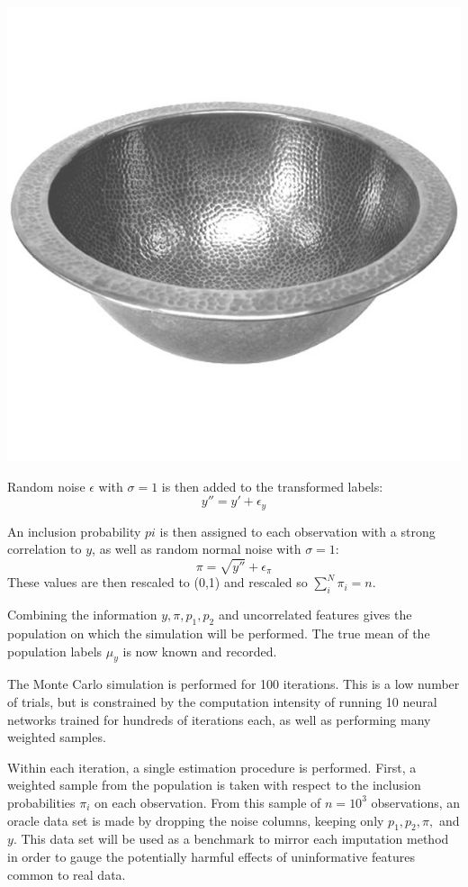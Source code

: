 \documentclass[12pt,twoside]{reedthesis}
\begin{document}
\includegraphics{figure/bowl.jpg}

Random noise \(\epsilon\) with \(\sigma = 1\) is then added to the
transformed labels: \[
y'' = y' + \epsilon_y
\]

An inclusion probability \(pi\) is then assigned to each observation
with a strong correlation to \(y\), as well as random normal noise with
\(\sigma = 1\): \[
\pi = \sqrt{y''} + \epsilon_\pi
\] These values are then rescaled to (0,1) and rescaled so
\(\sum_i^N \pi_i = n\).

Combining the information \(y,\pi, p_1, p_2\) and uncorrelated features
gives the population on which the simulation will be performed. The true
mean of the population labels \(\mu_y\) is now known and recorded.

The Monte Carlo simulation is performed for 100 iterations. This is a
low number of trials, but is constrained by the computation intensity of
running 10 neural networks trained for hundreds of iterations each, as
well as performing many weighted samples.

Within each iteration, a single estimation procedure is performed.
First, a weighted sample from the population is taken with respect to
the inclusion probabilities \(\pi_i\) on each observation. From this
sample of \(n=10^3\) observations, an oracle data set is made by
dropping the noise columns, keeping only \(p_1, p_2, \pi,\) and \(y\).
This data set will be used as a benchmark to mirror each imputation
method in order to gauge the potentially harmful effects of
uninformative features common to real data.
\end{document}
